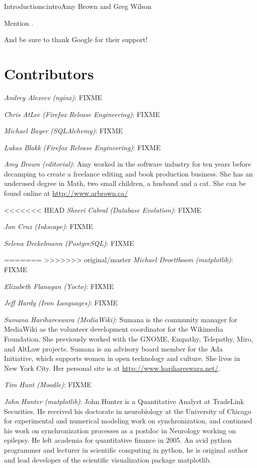 \begin{aosachapter}{Introduction}{s:intro}{Amy Brown and Greg Wilson}

Mention \cite{bib:aosa1}.

And be sure to thank Google for their support!

\section*{Contributors}

\emph{Andrey Alexeev (nginx)}: FIXME

\emph{Chris AtLee (Firefox Release Engineering)}: FIXME

\emph{Michael Bayer (SQLAlchemy)}: FIXME

\emph{Lukas Blakk (Firefox Release Engineering)}: FIXME

\emph{Amy Brown (editorial)}: Amy worked in the software industry for
ten years before decamping to create a freelance editing and book production
business. She has an underused degree in Math, two small children, a
husband and a cat. She can be found online at \url{http://www.arbrown.ca/}

<<<<<<< HEAD
\emph{Sheeri Cabral (Database Evolution)}: FIXME

\emph{Jon Cruz (Inkscape)}: FIXME

\emph{Selena Deckelmann (PostgreSQL)}: FIXME

=======
>>>>>>> original/master
\emph{Michael Droettboom (matplotlib)}: FIXME

\emph{Elizabeth Flanagan (Yocto)}: FIXME

\emph{Jeff Hardy (Iron Languages)}: FIXME

\emph{Sumana Harihareswara (MediaWiki)}: Sumana is the community manager for
MediaWiki as the volunteer development coordinator for the Wikimedia
Foundation. She previously worked with the GNOME, Empathy, Telepathy,
Miro, and AltLaw projects. Sumana is an advisory board member for the
Ada Initiative, which supports women in open technology and culture.
She lives in New York City. Her personal site is at
\url{http://www.harihareswara.net/}.

\emph{Tim Hunt (Moodle)}: FIXME

\emph{John Hunter (matplotlib)}: John Hunter is a Quantitative Analyst
at TradeLink Securities.  He received his doctorate in neurobiology at
the University of Chicago for experimental and numerical modeling work
on synchronization, and continued his work on synchronization
processes as a postdoc in Neurology working on epilepsy. He left
academia for quantitative finance in 2005.  An avid python programmer
and lecturer in scientific computing in python, he is original author
and lead developer of the scientific visualization package matplotlib.


\end{aosachapter}
